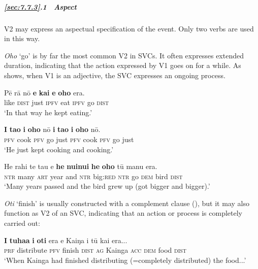 \subparagraph{\ref{sec:7.7.3}.1~ Aspect} V2 may express an aspectual specification of the event. Only two verbs are used in this way.

\textit{Oho} ‘go’ is by far the most common V2 in SVCs. It often expresses extended duration, indicating that the action expressed by V1 goes on for a while. As  shows, when V1 is an adjective, the SVC expresses an ongoing process.

\ea\label{ex:7.178}
\gll Pē rā nō \textbf{e} \textbf{kai} \textbf{e} \textbf{oho} era. \\
like \textsc{dist} just \textsc{ipfv} eat \textsc{ipfv} go \textsc{dist} \\

\glt 
‘In that way he kept eating.’ \textstyleExampleref{[R310.225]} 
\z

\ea\label{ex:7.179}
\gll \textbf{I} \textbf{ta{\ꞌ}o} \textbf{i} \textbf{oho} nō \textbf{i} \textbf{ta{\ꞌ}o} \textbf{i} \textbf{oho} nō. \\
\textsc{pfv} cook \textsc{pfv} go just \textsc{pfv} cook \textsc{pfv} go just \\

\glt 
‘He just kept cooking and cooking.’ \textstyleExampleref{[R352.077]} 
\z

\ea\label{ex:7.180}
\gll He rahi te ta{\ꞌ}u {\ꞌ}e \textbf{he} \textbf{nuinui} \textbf{he} \textbf{oho} tū manu era. \\
\textsc{ntr} many \textsc{art} year and \textsc{ntr} big:\textsc{red} \textsc{ntr} go \textsc{dem} bird \textsc{dist} \\

\glt
‘Many years passed and the bird grew up (got bigger and bigger).’ \textstyleExampleref{[R447.012]} 
\z

\textit{Oti} ‘finish’ is usually constructed with a complement clause (), but it may also function as V2 of an SVC, indicating that an action or process is completely carried out:

\ea\label{ex:7.181}
\gll \textbf{I} \textbf{tuha{\ꞌ}a} \textbf{i} \textbf{oti} era e Kaiŋa i tū kai era... \\
\textsc{prf} distribute \textsc{pfv} finish \textsc{dist} \textsc{ag} Kainga \textsc{acc} \textsc{dem} food \textsc{dist} \\

\glt 
‘When Kainga had finished distributing (=completely distributed) the food...’ \textstyleExampleref{[R304.116]} 
\z

